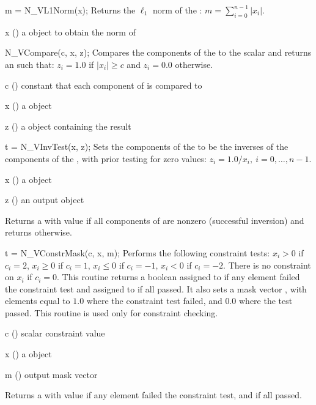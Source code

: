 {
  m = N\_VL1Norm(x);
}
{
  Returns the $\ell_1$ norm of the  :
  $m = \sum_{i=0}^{n-1} | x_i |$.
}
{
  \begin{args}[x]
  \item[x] () a {\nvector} object to obtain the norm of
  \end{args}
}
{
}
{}

{
  N\_VCompare(c, x, z);
}
{
  Compares the components of the   to the 
  scalar  and returns an   such that:
  $z_i = 1.0$ if $| x_i | \ge c$ and $z_i = 0.0$ otherwise.
}
{
  \begin{args}[c]
  \item[c] () constant that each component of  is compared to
  \item[x] () a {\nvector} object
  \item[z] () a {\nvector} object containing the result
  \end{args}
}
{}
{}

{
  t = N\_VInvTest(x, z);
}
{
  Sets the components of the   to be the inverses
  of the components of the  , with prior testing
  for zero values: $z_i = 1.0 /  x_i  , \: i=0,\ldots,n-1$.
}
{
  \begin{args}[x]
  \item[x] () a {\nvector} object
  \item[z] () an output {\nvector} object
  \end{args}
}
{
  Returns a  with value  if all components
  of  are nonzero (successful inversion) and returns
   otherwise.
}
{}

{
  t = N\_VConstrMask(c, x, m);
}
{
  Performs the following constraint tests:
  $x_i > 0$ if $c_i=2$,
  $x_i \ge 0$ if $c_i=1$,
  $x_i \le 0$ if $c_i=-1$,
  $x_i < 0$ if $c_i=-2$.
  There is no constraint on $x_i$ if $c_i=0$. This routine returns a boolean
  assigned to  if any element failed the constraint test and
  assigned to  if all passed.  It also sets a mask vector ,
  with elements equal to $1.0$ where the constraint test failed, and $0.0$
  where the test passed. This routine is used only for constraint checking.
}
{
  \begin{args}[c]
  \item[c] () scalar constraint value
  \item[x] () a {\nvector} object
  \item[m] () output mask vector
  \end{args}
}
{
  Returns a  with value  if any element failed the
  constraint test, and  if all passed.
}
{}

